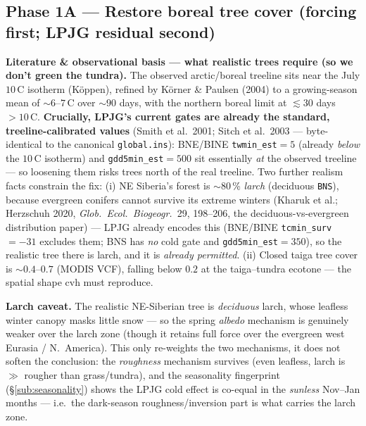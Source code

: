 \documentclass[10pt]{article}
\begin{document}
\subsection{Phase 1A --- Restore boreal tree cover (forcing first; LPJG residual second)}
\textbf{Literature \& observational basis --- what realistic trees require (so we don't green the tundra).} The
observed arctic/boreal treeline sits near the July $10$\,\textdegree C isotherm (K\"oppen), refined by K\"orner \&
Paulsen (2004) to a growing-season mean of $\sim6$--$7$\,\textdegree C over $\sim90$ days, with the northern boreal
limit at $\lesssim30$ days $>10$\,\textdegree C. \textbf{Crucially, LPJG's current gates are already the standard,
treeline-calibrated values} (Smith et al.\ 2001; Sitch et al.\ 2003 --- byte-identical to the canonical
\texttt{global.ins}): BNE/BINE \texttt{twmin\_est}$=5$ (already \emph{below} the $10$\,\textdegree C isotherm) and
\texttt{gdd5min\_est}$=500$ sit essentially \emph{at} the observed treeline --- so loosening them risks trees north
of the real treeline. Two further realism facts constrain the fix: (i) NE Siberia's forest is $\sim$80\,\% \emph{larch}
(deciduous \texttt{BNS}), because evergreen conifers cannot survive its extreme winters (Kharuk et al.; Herzschuh
2020, \emph{Glob.\ Ecol.\ Biogeogr.}\ 29, 198--206, the deciduous-vs-evergreen distribution paper) --- LPJG already
encodes this (BNE/BINE \texttt{tcmin\_surv}$=-31$ excludes them; BNS has \emph{no} cold gate and
\texttt{gdd5min\_est}$=350$), so the realistic tree there is larch, and it is \emph{already permitted}. (ii) Closed
taiga tree cover is $\sim0.4$--$0.7$ (MODIS VCF), falling below $0.2$ at the taiga--tundra ecotone --- the spatial
shape cvh must reproduce.

\textbf{Larch caveat.} The realistic NE-Siberian tree is \emph{deciduous} larch, whose leafless winter canopy masks
little snow --- so the spring \emph{albedo} mechanism is genuinely weaker over the larch zone (though it retains full
force over the evergreen west Eurasia / N.\ America). This only re-weights the two mechanisms, it does not soften the
conclusion: the \emph{roughness} mechanism survives (even leafless, larch is $\gg$ rougher than grass/tundra), and the
seasonality fingerprint (\S\ref{sub:seasonality}) shows the LPJG cold effect is co-equal in the \emph{sunless}
Nov--Jan months --- i.e.\ the dark-season roughness/inversion part is what carries the larch zone.
\end{document}
